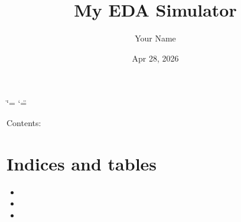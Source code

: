 \documentclass[letterpaper,10pt,english]{sphinxmanual}
\title{My EDA Simulator}
\date{Apr 28, 2026}
\author{Your Name}
\begin{document}
\ifdefined\shorthandoff
  \ifnum\catcode`\=\string=\active\shorthandoff{=}\fi
  \ifnum\catcode`\"=\active{}\fi
\fi

\pagestyle{empty}
\sphinxmaketitle
\pagestyle{plain}
\sphinxtableofcontents
\pagestyle{normal}
\label{\detokenize{index::doc}}


\sphinxAtStartPar
Contents:


\chapter{Indices and tables}
\label{\detokenize{index:indices-and-tables}}\begin{itemize}
\item {} 
\sphinxAtStartPar
{}

\item {} 
\sphinxAtStartPar
{}

\item {} 
\sphinxAtStartPar
{}

\end{itemize}



\renewcommand{\indexname}{Index}
\printindex
\end{document}
